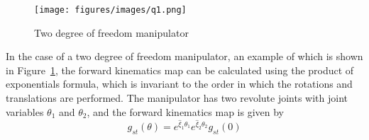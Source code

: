 \begin{figure}[htb]
    \centering
    \texttt{[image: figures/images/q1.png]}
    \caption{
        Two degree of freedom manipulator
    }\label{fig:2dof-manipulator}
\end{figure}

In the case of a two degree of freedom manipulator, an example of which is shown in Figure~\ref{fig:2dof-manipulator}, the forward kinematics map can be calculated using the product of exponentials formula, which is invariant to the order in which the rotations and translations are performed.
The manipulator has two revolute joints with joint variables \( \theta_1 \) and \( \theta_2 \), and the forward kinematics map is given by
\begin{equation}
    g_{st}(\theta)
    =
    e^{\widehat{\xi}_1 \theta_1}
    e^{\widehat{\xi}_2 \theta_2}
    g_{st}(0)
\end{equation}
